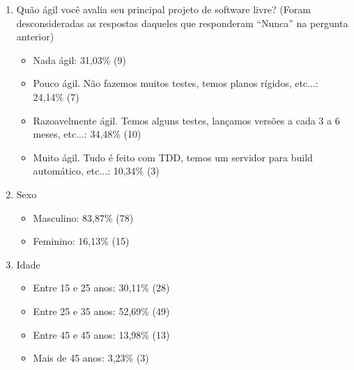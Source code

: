 \begin{enumerate}
\item Quão ágil você avalia seu principal projeto de software livre?
  (Foram desconsideradas as respostas daqueles que responderam
  ``Nunca'' na pergunta anterior)
  \begin{itemize}
  \item Nada ágil: 31,03\% (9)
  \item Pouco ágil. Não fazemos muitos testes, temos planos rígidos,
    etc...: 24,14\% (7)
  \item Razoavelmente ágil. Temos alguns testes, lançamos versões a
    cada 3 a 6 meses, etc...: 34,48\% (10)
  \item Muito ágil. Tudo é feito com TDD, temos um servidor para build
    automático, etc...: 10,34\% (3)
  \end{itemize}

\item Sexo
  \begin{itemize}
  \item Masculino: 83,87\% (78)
  \item Feminino: 16,13\% (15)
  \end{itemize}

\item Idade
  \begin{itemize}
  \item Entre 15 e 25 anos: 30,11\% (28)
  \item Entre 25 e 35 anos: 52,69\% (49)
  \item Entre 45 e 45 anos: 13,98\% (13)
  \item Mais de 45 anos: 3,23\% (3)
  \end{itemize}
\end{enumerate}
